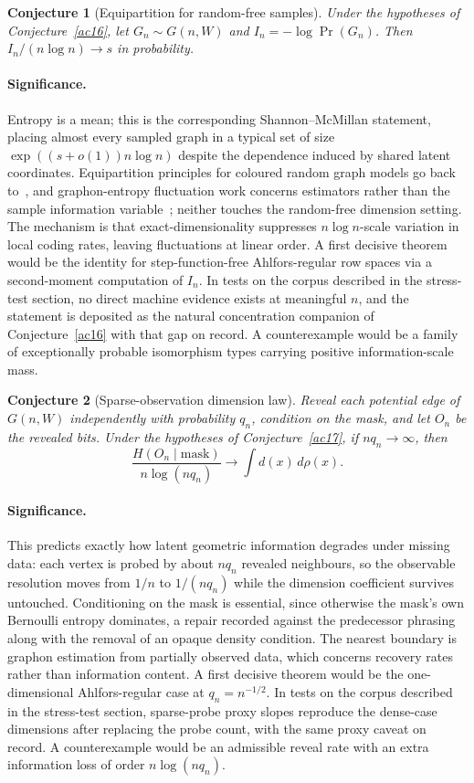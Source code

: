 \documentclass[11pt]{article}
\newtheorem{conjecture}{Conjecture}
\theoremstyle{definition}
\begin{document}
\begin{conjecture}[Equipartition for random-free samples]\label{ac19}
Under the hypotheses of Conjecture~\ref{ac16}, let $G_n\sim G(n,W)$ and $I_n=-\log\Pr(G_n)$.  Then $I_n/(n\log n)\to s$ in probability.
\end{conjecture}

\paragraph{Significance.}
Entropy is a mean; this is the corresponding Shannon--McMillan statement, placing almost every sampled graph in a typical set of size $\exp((s+o(1))n\log n)$ despite the dependence induced by shared latent coordinates.  Equipartition principles for coloured random graph models go back to~\cite{DA12}, and graphon-entropy fluctuation work concerns estimators rather than the sample information variable~\cite{SO23}; neither touches the random-free dimension setting.  The mechanism is that exact-dimensionality suppresses $n\log n$-scale variation in local coding rates, leaving fluctuations at linear order.  A first decisive theorem would be the identity for step-function-free Ahlfors-regular row spaces via a second-moment computation of $I_n$.  In tests on the corpus described in the stress-test section, no direct machine evidence exists at meaningful $n$, and the statement is deposited as the natural concentration companion of Conjecture~\ref{ac16} with that gap on record.  A counterexample would be a family of exceptionally probable isomorphism types carrying positive information-scale mass.

\begin{conjecture}[Sparse-observation dimension law]\label{ac20}
Reveal each potential edge of $G(n,W)$ independently with probability $q_n$, condition on the mask, and let $O_n$ be the revealed bits.  Under the hypotheses of Conjecture~\ref{ac17}, if $nq_n\to\infty$, then
\[
\frac{H(O_n\mid\text{mask})}{n\log(nq_n)}\longrightarrow\int d(x)\,d\rho(x).
\]
\end{conjecture}

\paragraph{Significance.}
This predicts exactly how latent geometric information degrades under missing data: each vertex is probed by about $nq_n$ revealed neighbours, so the observable resolution moves from $1/n$ to $1/(nq_n)$ while the dimension coefficient survives untouched.  Conditioning on the mask is essential, since otherwise the mask's own Bernoulli entropy dominates, a repair recorded against the predecessor phrasing along with the removal of an opaque density condition.  The nearest boundary is graphon estimation from partially observed data, which concerns recovery rates rather than information content.  A first decisive theorem would be the one-dimensional Ahlfors-regular case at $q_n=n^{-1/2}$.  In tests on the corpus described in the stress-test section, sparse-probe proxy slopes reproduce the dense-case dimensions after replacing the probe count, with the same proxy caveat on record.  A counterexample would be an admissible reveal rate with an extra information loss of order $n\log(nq_n)$.
\end{document}
